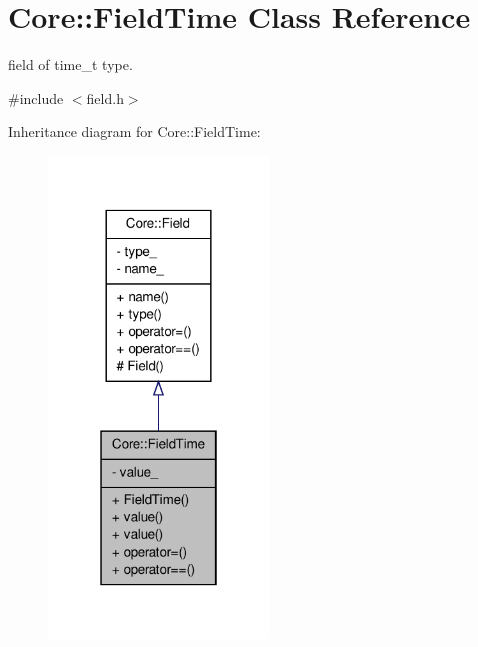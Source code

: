 \hypertarget{classCore_1_1FieldTime}{
\section{Core::FieldTime Class Reference}
\label{d3/d8b/classCore_1_1FieldTime}
}


field of time\_\-t type.  




{\ttfamily \#include $<$field.h$>$}



Inheritance diagram for Core::FieldTime:
\nopagebreak
\begin{figure}[H]
\begin{center}
\leavevmode
\includegraphics[width=166pt]{d7/d6a/classCore_1_1FieldTime__inherit__graph}
\end{center}
\end{figure}


